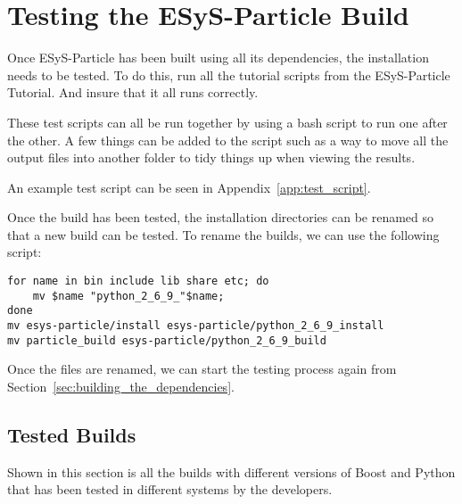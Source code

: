 
\chapter{Testing the ESyS-Particle Build} %
\label{cha:testing_the_esys_particle_build}

Once ESyS-Particle has been built using all its dependencies, the installation needs to be tested. To do this, run all the tutorial scripts from the ESyS-Particle Tutorial. And insure that it all runs correctly.

These test scripts can all be run together by using a bash script to run one after the other. A few things can be added to the script such as a way to move all the output files into another folder to tidy things up when viewing the results.

An example test script can be seen in Appendix~\ref{app:test_script}.

Once the build has been tested, the installation directories can be renamed so that a new build can be tested. To rename the builds, we can use the following script:
\begin{lstlisting}[style=inlineBash]
for name in bin include lib share etc; do
	mv $name "python_2_6_9_"$name;
done
mv esys-particle/install esys-particle/python_2_6_9_install
mv particle_build esys-particle/python_2_6_9_build
\end{lstlisting}

Once the files are renamed, we can start the testing process again from Section~\ref{sec:building_the_dependencies}.

\clearpage
\section{Tested Builds} %
\label{sec:tested_builds}

Shown in this section is all the builds with different versions of Boost and Python that has been tested in different systems by the developers.

